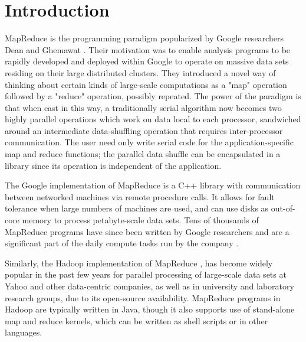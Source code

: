 \section{Introduction}

MapReduce is the programming paradigm popularized by Google
researchers Dean and Ghemawat \cite{Dean}.  Their motivation was to
enable analysis programs to be rapidly developed and deployed within
Google to operate on massive data sets residing on their large
distributed clusters.  They introduced a novel way of thinking about
certain kinds of large-scale computations as a "map" operation
followed by a "reduce" operation, possibly repeated.  The power of the
paradigm is that when cast in this way, a traditionally serial
algorithm now becomes two highly parallel operations which work on
data local to each processor, sandwiched around an intermediate
data-shuffling operation that requires inter-processor communication.
The user need only write serial code for the application-specific map
and reduce functions; the parallel data shuffle can be encapsulated in
a library since its operation is independent of the application.

The Google implementation of MapReduce is a C++ library with
communication between networked machines via remote procedure calls.
It allows for fault tolerance when large numbers of machines are used,
and can use disks as out-of-core memory to process petabyte-scale data
sets.  Tens of thousands of MapReduce programs have since been written
by Google researchers and are a significant part of the daily compute
tasks run by the company \cite{Dean2}.

Similarly, the Hadoop implementation of MapReduce \cite{Hadoop}, has
become widely popular in the past few years for parallel processing of
large-scale data sets at Yahoo and other data-centric companies, as
well as in university and laboratory research groups, due to its
open-source availability.  MapReduce programs in Hadoop are typically
written in Java, though it also supports use of stand-alone map and
reduce kernels, which can be written as shell scripts or in other
languages.

